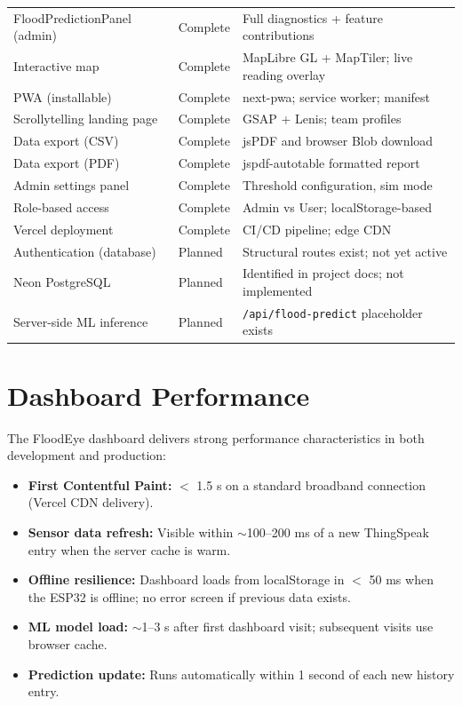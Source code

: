 \begin{table}[htbp]
\begin{tabularx}{\linewidth}{|l|l|X|}
FloodPredictionPanel (admin) & Complete & Full diagnostics + feature contributions \\
Interactive map & Complete & MapLibre GL + MapTiler; live reading overlay \\
PWA (installable) & Complete & next-pwa; service worker; manifest \\
Scrollytelling landing page & Complete & GSAP + Lenis; team profiles \\
Data export (CSV) & Complete & jsPDF and browser Blob download \\
Data export (PDF) & Complete & jspdf-autotable formatted report \\
Admin settings panel & Complete & Threshold configuration, sim mode \\
Role-based access & Complete & Admin vs User; localStorage-based \\
Vercel deployment & Complete & CI/CD pipeline; edge CDN \\
\hline
Authentication (database) & Planned & Structural routes exist; not yet active \\
Neon PostgreSQL & Planned & Identified in project docs; not implemented \\
Server-side ML inference & Planned & \texttt{/\allowbreak{}api/\allowbreak{}flood-predict} placeholder exists \\
\hline
\end{tabularx}
\end{table}

\section{Dashboard Performance}

The FloodEye dashboard delivers strong performance characteristics in both development and production:

\begin{itemize}[leftmargin=1.5em]
  \item \textbf{First Contentful Paint:} $<$ 1.5 s on a standard broadband connection (Vercel CDN delivery).
  \item \textbf{Sensor data refresh:} Visible within $\sim$100--200 ms of a new ThingSpeak entry when the server cache is warm.
  \item \textbf{Offline resilience:} Dashboard loads from localStorage in $<$ 50 ms when the ESP32 is offline; no error screen if previous data exists.
  \item \textbf{ML model load:} $\sim$1--3 s after first dashboard visit; subsequent visits use browser cache.
  \item \textbf{Prediction update:} Runs automatically within 1 second of each new history entry.
\end{itemize}


